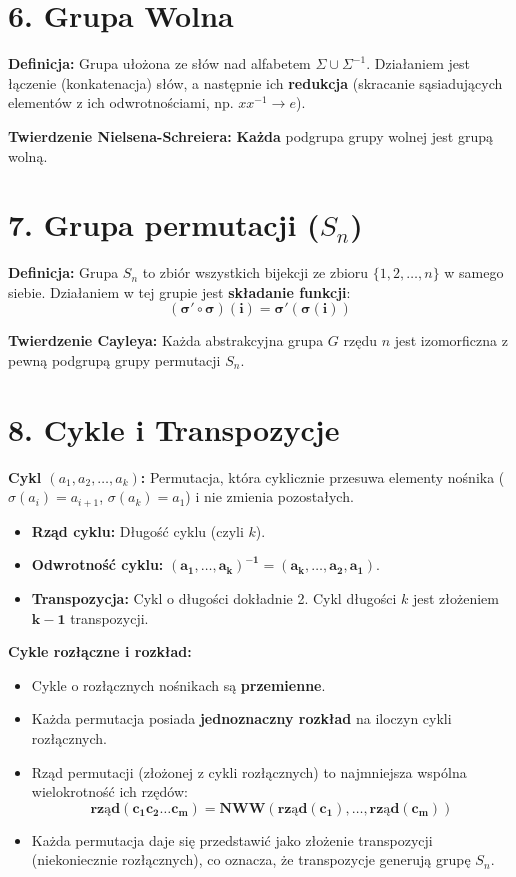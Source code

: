 \documentclass[12pt,a4paper]{article}
\begin{document}
\section*{6. Grupa Wolna}
\noindent\textbf{Definicja:} Grupa ułożona ze słów nad alfabetem $\Sigma \cup \Sigma^{-1}$. Działaniem jest łączenie (konkatenacja) słów, a następnie ich \textbf{redukcja} (skracanie sąsiadujących elementów z ich odwrotnościami, np. $x x^{-1} \to e$). %

\noindent\textbf{Twierdzenie Nielsena-Schreiera:} \textbf{Każda} podgrupa grupy wolnej jest grupą wolną. %

\section*{7. Grupa permutacji ($S_n$)}
\noindent\textbf{Definicja:} Grupa $S_n$ to zbiór wszystkich bijekcji ze zbioru $\{1,2,\dots,n\}$ w samego siebie. %
Działaniem w tej grupie jest \textbf{składanie funkcji}: %
$$ \mathbf{(\sigma' \circ \sigma)(i) = \sigma'(\sigma(i))} $$ %

\noindent\textbf{Twierdzenie Cayleya:} Każda abstrakcyjna grupa $G$ rzędu $n$ jest izomorficzna z pewną podgrupą grupy permutacji $S_n$. %

\section*{8. Cykle i Transpozycje}
\noindent\textbf{Cykl $(a_1, a_2, \dots, a_k)$:} Permutacja, która cyklicznie przesuwa elementy nośnika ($\sigma(a_i) = a_{i+1}$, $\sigma(a_k)=a_1$) i nie zmienia pozostałych. %
\begin{itemize}
    \item \textbf{Rząd cyklu:} Długość cyklu (czyli $k$). %
    \item \textbf{Odwrotność cyklu:} $\mathbf{(a_1, \dots, a_k)^{-1} = (a_k, \dots, a_2, a_1)}$. %
    \item \textbf{Transpozycja:} Cykl o długości dokładnie 2. Cykl długości $k$ jest złożeniem $\mathbf{k-1}$ transpozycji. %
\end{itemize}

\noindent\textbf{Cykle rozłączne i rozkład:}
\begin{itemize}
    \item Cykle o rozłącznych nośnikach są \textbf{przemienne}. %
    \item Każda permutacja posiada \textbf{jednoznaczny rozkład} na iloczyn cykli rozłącznych. %
    \item Rząd permutacji (złożonej z cykli rozłącznych) to najmniejsza wspólna wielokrotność ich rzędów: %
    $$ \mathbf{rząd(c_1 c_2 \dots c_m) = NWW(rząd(c_1), \dots, rząd(c_m))}$$ %
    \item Każda permutacja daje się przedstawić jako złożenie transpozycji (niekoniecznie rozłącznych), co oznacza, że transpozycje generują grupę $S_n$. %
\end{itemize}
\end{document}
